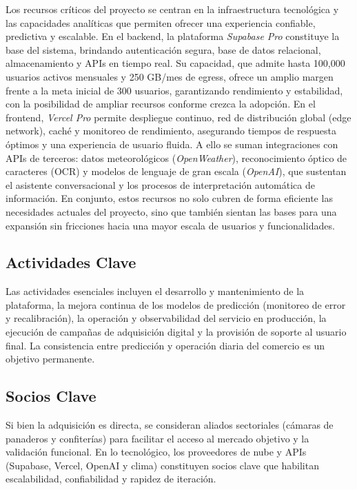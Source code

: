 Los recursos críticos del proyecto se centran en la infraestructura tecnológica y las capacidades analíticas que permiten ofrecer una experiencia confiable, predictiva y escalable.
En el backend, la plataforma \emph{Supabase Pro} constituye la base del sistema, brindando autenticación segura, base de datos relacional, almacenamiento y APIs en tiempo real. Su capacidad, que admite hasta 100{,}000 usuarios activos mensuales y 250 GB/mes de egress, ofrece un amplio margen frente a la meta inicial de 300 usuarios, garantizando rendimiento y estabilidad, con la posibilidad de ampliar recursos conforme crezca la adopción.
En el frontend, \emph{Vercel Pro} permite despliegue continuo, red de distribución global (edge network), caché y monitoreo de rendimiento, asegurando tiempos de respuesta óptimos y una experiencia de usuario fluida.
A ello se suman integraciones con APIs de terceros: datos meteorológicos (\emph{OpenWeather}), reconocimiento óptico de caracteres (OCR) y modelos de lenguaje de gran escala (\emph{OpenAI}), que sustentan el asistente conversacional y los procesos de interpretación automática de información.
En conjunto, estos recursos no solo cubren de forma eficiente las necesidades actuales del proyecto, sino que también sientan las bases para una expansión sin fricciones hacia una mayor escala de usuarios y funcionalidades.

\subsection{Actividades Clave}
Las actividades esenciales incluyen el desarrollo y mantenimiento de la plataforma, la mejora continua de los modelos de predicción (monitoreo de error y recalibración), la operación y observabilidad del servicio en producción, la ejecución de campañas de adquisición digital y la provisión de soporte al usuario final. La consistencia entre predicción y operación diaria del comercio es un objetivo permanente.

\subsection{Socios Clave}
Si bien la adquisición es directa, se consideran aliados sectoriales (cámaras de panaderos y confiterías) para facilitar el acceso al mercado objetivo y la validación funcional. En lo tecnológico, los proveedores de nube y APIs (Supabase, Vercel, OpenAI y clima) constituyen socios clave que habilitan escalabilidad, confiabilidad y rapidez de iteración.

